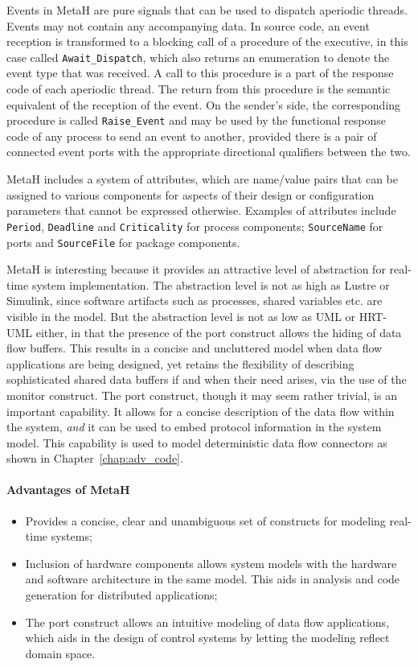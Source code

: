 Events in MetaH are pure signals that can be used to dispatch
aperiodic threads. Events may not contain any accompanying data. In
source code, an event reception is transformed to a blocking call of a
procedure of the executive, in this case called
\texttt{Await\_Dispatch}, which also returns an enumeration to denote
the event type that was received. A call to this procedure is a part
of the response code of each aperiodic thread. The return from this
procedure is the semantic equivalent of the reception of the event. On
the sender's side, the corresponding procedure is called
\texttt{Raise\_Event} and may be used by the functional response code
of any process to send an event to another, provided there is a pair
of connected event ports with the appropriate directional qualifiers
between the two.

MetaH includes a system of attributes, which are name/value pairs that
can be assigned to various components for aspects of their design or
configuration parameters that cannot be expressed otherwise. Examples
of attributes include \texttt{Period}, \texttt{Deadline} and
\texttt{Criticality} for process components; \texttt{SourceName} for
ports and \texttt{SourceFile} for package components.

MetaH is interesting because it provides an attractive level of
abstraction for real-time system implementation. The abstraction level
is not as high as Lustre or Simulink, since software artifacts such as
processes, shared variables etc. are visible in the model. But the
abstraction level is not as low as UML or HRT-UML either, in that the
presence of the port construct allows the hiding of data flow
buffers. This results in a concise and uncluttered model when data
flow applications are being designed, yet retains the flexibility of
describing sophisticated shared data buffers if and when their need
arises, via the use of the monitor construct. The port construct,
though it may seem rather trivial, is an important capability. It
allows for a concise description of the data flow within the system,
\emph{and} it can be used to embed protocol information in the system
model. This capability is used to model deterministic data flow
connectors as shown in Chapter~\ref{chap:adv_code}.

\paragraph{Advantages of MetaH}
\begin{itemize}
\item{Provides a concise, clear and unambiguous set of constructs for
  modeling real-time systems;}
\item{Inclusion of hardware components allows system models with the
  hardware and software architecture in the same model. This aids in
  analysis and code generation for distributed applications;}
\item{The port construct allows an intuitive modeling of data flow
  applications, which aids in the design of control systems by letting
  the modeling reflect domain space.}
\end{itemize}

